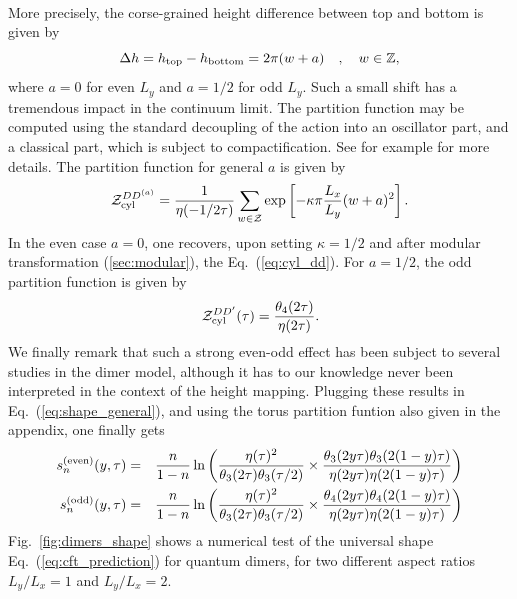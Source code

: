 \documentclass[11pt]{iopart}
\begin{document}
\paragraph{}
More precisely, the corse-grained height difference between top and bottom is given by
\begin{equation}
 \Delta h =h_{\rm top}-h_{\rm bottom}=2\pi (w+a)\quad,\quad w \in \mathbb{Z},
\end{equation}
where $a=0$ for even $L_y$ and $a=1/2$ for odd $L_y$. 
Such a small shift has a tremendous impact in the continuum limit. The partition function may be computed using the standard decoupling of the action into an oscillator part, and a classical part, which is subject to compactification. See for example \cite{EggertAffleck,FSW,BigYellowBook} for more details. 
The partition function for general $a$ is given by
\begin{equation}
 \mathcal{Z}_{\rm cyl}^{DD^{(a)}}=\frac{1}{\eta(-1/2\tau)}\sum_{w \in \mathcal{Z}}\exp \left[-\kappa \pi\frac{L_x}{L_y} (w+a)^2\right].
\end{equation}
In the even case $a=0$, one recovers, upon setting $\kappa=1/2$ and after modular transformation (\ref{sec:modular}), the Eq.~(\ref{eq:cyl_dd}). For $a=1/2$, the odd partition function is given by 
\begin{equation}
 \mathcal{Z}_{\rm cyl}^{DD^\prime}(\tau)=\frac{\theta_4(2\tau)}{\eta(2\tau)}.
\end{equation}
We finally remark that such a strong even-odd effect has been subject to several studies in the dimer model\cite{Ferdinand,Dimers_all,Ruelledimers}, although it has to our knowledge never been interpreted in the context of the height mapping. Plugging these results in Eq.~(\ref{eq:shape_general}), and using the torus partition funtion\cite{BigYellowBook} also given in the appendix, one finally gets
\begin{eqnarray}\label{eq:cft_prediction}
 s_n^{\rm (even)}(y,\tau)&=&\frac{n}{1-n}\ln \left(\frac{\eta(\tau)^2}{\theta_3(2\tau)\theta_3(\tau/2)}\times\frac{\theta_3(2y \tau)\theta_3(2(1-y)\tau)}{\eta(2y\tau)\eta(2(1-y)\tau)}\right)\\
 s_n^{\rm (odd)}(y,\tau)&=&\frac{n}{1-n}\ln \left(\frac{\eta(\tau)^2}{\theta_3(2\tau)\theta_3(\tau/2)}\times\frac{\theta_4(2y \tau)\theta_4(2(1-y)\tau)}{\eta(2y\tau)\eta(2(1-y)\tau)}\right)
\end{eqnarray}
Fig.~\ref{fig:dimers_shape} shows a numerical test of the universal shape Eq.~(\ref{eq:cft_prediction}) for quantum dimers, for two different aspect ratios $L_y/L_x=1$ and $L_y/L_x=2$.  
\end{document}
